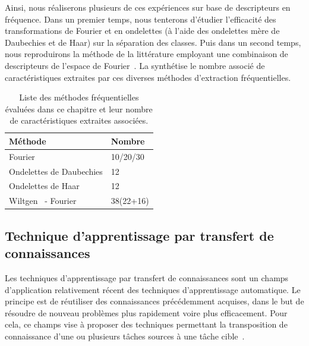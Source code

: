 Ainsi, nous réaliserons plusieurs de ces expériences sur base de descripteurs en fréquence. Dans un premier temps, nous tenterons d'étudier l'efficacité des transformations de Fourier et en ondelettes (à l'aide des ondelettes mère de Daubechies et de Haar) sur la séparation des classes. Puis dans un second temps, nous reproduirons la méthode de la littérature employant une combinaison de descripteurs de l'espace de Fourier~\cite{Wiltgen2008}. La  synthétise le nombre associé de caractéristiques extraites par ces diverses méthodes d'extraction fréquentielles.\par

\begin{table}[H]
    \centering
    \begin{tabular*}{0.6\linewidth}{l@{\extracolsep{\fill}}l}
        \toprule
        \textbf{Méthode}                        & \textbf{Nombre}   \\ \hline
        Fourier                                 & 10/20/30          \\ \hline
        Ondelettes de Daubechies                & 12                \\ \hline
        Ondelettes de Haar                      & 12                \\ \hline
        Wiltgen~\cite{Wiltgen2008} - Fourier    & 38(22+16)         \\
        \bottomrule
    \end{tabular*}
    \caption{Liste des méthodes fréquentielles évaluées dans ce chapitre et leur nombre de caractéristiques extraites associées.}
    \label{tab:number_features_frequency}
\end{table}\par

\subsection{Technique d'apprentissage par transfert de connaissances}
Les techniques d'apprentissage par transfert de connaissances sont un champs d'application relativement récent des techniques d'apprentissage automatique. Le principe est de réutiliser des connaissances précédemment acquises, dans le but de résoudre de nouveau problèmes plus rapidement voire plus efficacement. Pour cela, ce champs vise à proposer des techniques permettant la transposition de connaissance d'une ou plusieurs tâches sources à une tâche cible~\cite{QiangYang2010}.\par

